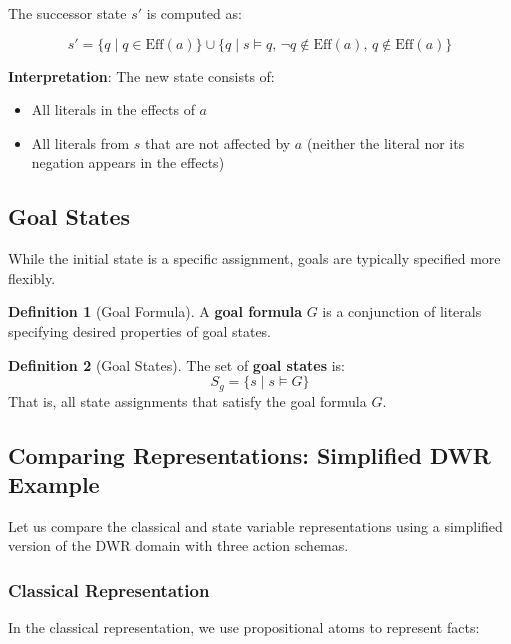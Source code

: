 \documentclass[11pt,a4paper]{article}
\theoremstyle{definition}
\newtheorem{definition}{Definition}[section]
\theoremstyle{plain}
\theoremstyle{remark}
\begin{document}
The successor state $s'$ is computed as:

\[
s' = \{q \mid q \in \text{Eff}(a)\} \cup \{q \mid s \models q, \, \neg q \notin \text{Eff}(a), \, q \notin \text{Eff}(a)\}
\]

\textbf{Interpretation}: The new state consists of:
\begin{itemize}
    \item All literals in the effects of $a$
    \item All literals from $s$ that are not affected by $a$ (neither the literal nor its negation appears in the effects)
\end{itemize}

\subsection{Goal States}

While the initial state is a specific assignment, goals are typically specified more flexibly.

\begin{tcolorbox}[colback=cyan!5!white,colframe=cyan!75!black,title=\textbf{Goal Specification}]
\begin{definition}[Goal Formula]
A \textbf{goal formula} $G$ is a conjunction of literals specifying desired properties of goal states.
\end{definition}

\begin{definition}[Goal States]
The set of \textbf{goal states} is:
\[
S_g = \{ s \mid s \models G \}
\]
That is, all state assignments that satisfy the goal formula $G$.
\end{definition}
\end{tcolorbox}



\subsection{Comparing Representations: Simplified DWR Example}

Let us compare the classical and state variable representations using a simplified version of the DWR domain with three action schemas.

\subsubsection{Classical Representation}

In the classical representation, we use propositional atoms to represent facts:
\end{document}
